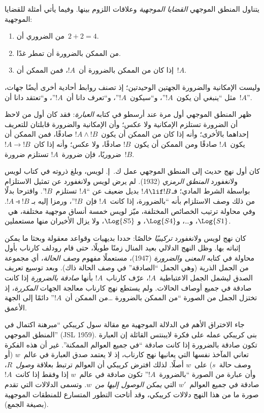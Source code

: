 \documentclass[../../../include/open-logic-section]{subfiles}
\begin{document}


يتناول المنطق الموجهي \emph{القضايا الموجهية} وعلاقات اللزوم بينها.
وفيما يأتي أمثلة للقضايا الموجهية:
\begin{enumerate}
\item من الضروري أن~$2+2=4$.
\item من الممكن بالضرورة أن تمطر غدًا.
\item إذا كان من الممكن بالضرورة أن~$!A$، فمن الممكن أن~$!A$.
\end{enumerate}
وليست الإمكانية والضرورة الجهتين الوحيدتين؛ إذ تصنف روابط أحادية أخرى
أيضًا جهات، مثل ``ينبغي أن يكون~$!A$''، و``سيكون~$!A$''، و``تعرف دانا
أن~$!A$''، و``تعتقد دانا أن~$!A$''.

ظهر المنطق الموجهي أول مرة عند أرسطو في كتابه \emph{العبارة}: فقد كان
أول من لاحظ أن الضرورة تستلزم الإمكانية ولا عكس؛ وأن الإمكانية
والضرورة قابلتان للتعريف إحداهما بالأخرى؛ وأنه إذا كان من الممكن أن
يكون~$!A \land !B$ صادقًا، فمن الممكن أن يكون~$!A$ صادقًا ومن الممكن
أن يكون~$!B$ صادقًا، ولا عكس؛ وأنه إذا كان~$!A \to !B$ ضروريًا، فإن
ضرورة~$!A$ تستلزم ضرورة~$!B$.

كان أول نهج حديث إلى المنطق الموجهي عمل ك.~إ. لويس، وبلغ ذروته في
كتاب لويس ولانغفورد \emph{المنطق الرمزي} (1932). لم يرض لويس ولانغفورد
عن تمثيل الاستلزام بواسطة الشرط المادي؛ فـ$!A \lif !B$ بديل ضعيف عن
``$!A$ تستلزم~$!B$''. واقترحا بدلًا من ذلك وصف الاستلزام بأنه
``بالضرورة، إذا كانت~$!A$ فإن~$!B$''، ورمزا إليه بـ
$!A \strictif !B$. وفي محاولة ترتيب الخصائص المختلفة، ميّز لويس خمسة
أنساق موجهية مختلفة، هي~$\Log{S1}$، و\ldots، و$\Log{S4}$، و
$\Log{S5}$، ولا يزال الأخيران منها مستعملين.

كان نهج لويس ولانغفورد \emph{تركيبيًا} خالصًا: حددا بديهيات وقواعد
معقولة وبحثا ما يمكن إثباته بها. وظل النهج الدلالي بعيد المنال زمنًا
طويلًا، حتى قام رودلف كارناب بأول محاولة في كتابه \emph{المعنى
والضرورة} (1947)، مستعملًا مفهوم \emph{وصف الحالة}، أي مجموعة من الجمل
الذرية (وهي الجمل ``الصادقة'' في وصف الحالة ذاك). وبعد توسيع تعريف
الصدق ليشمل الجمل الاعتباطية~$!A$، عرّف كارناب~$!A$ بأنها
\emph{صادقة بالضرورة} إذا كانت صادقة في جميع أوصاف الحالات. ولم يستطع
نهج كارناب معالجة الجهات \emph{المكررة}، إذ تختزل الجمل من الصورة
``من الممكن بالضرورة \ldots من الممكن أن~$!A$'' دائمًا إلى الجهة
الأعمق.

جاء الاختراق الأهم في الدلالة الموجهية مع مقالة سول كريبكي ``مبرهنة
اكتمال في المنطق الموجهي'' (JSL 1959). بنى كريبكي عمله على فكرة
لايبنتس القائلة إن العبارة تكون صادقة بالضرورة إذا كانت صادقة ``في
جميع العوالم الممكنة''. غير أن هذه الفكرة تعاني المآخذ نفسها التي
يعانيها نهج كارناب، إذ لا يعتمد صدق العبارة في عالم~$w$ (أو وصف
حالة~$s$) على~$w$ أصلًا. لذلك افترض كريبكي أن العوالم ترتبط بعلاقة
\emph{وصول}~$R$، وأن عبارة من الصورة ``بالضرورة~$!A$'' تكون صادقة في
عالم~$w$ إذا وفقط إذا كانت~$!A$ صادقة في جميع العوالم~$w'$ التي
\emph{يمكن الوصول إليها من}~$w$. وتسمى الدلالات التي تقدم صورة ما من
هذا النهج دلالات كريبكي، وقد أتاحت التطور المتسارع للمنطقات الموجهية
(بصيغة الجمع).
\end{document}
